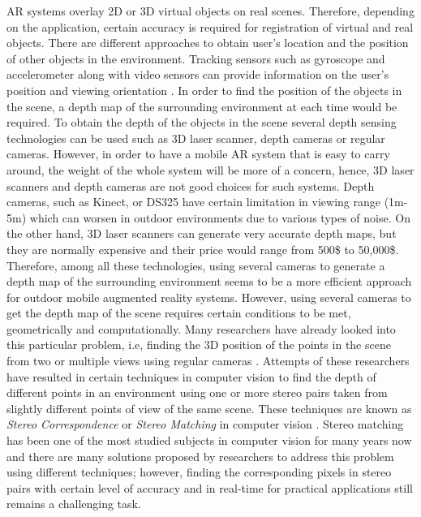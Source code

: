 \documentclass[12pt]{report}
\begin{document}
AR systems overlay 2D or 3D virtual objects on real scenes. Therefore, depending on the application, certain accuracy is required for 
registration of virtual and real objects. There are different approaches to obtain user's location and the position of other objects in the environment.
Tracking sensors such as gyroscope and accelerometer along with video sensors can provide information on the user's position and viewing orientation \cite{azum01}.
In order to find the position of the objects in the scene, a depth map of the surrounding environment at each time would be required. To obtain the depth of the 
objects in the scene several depth sensing technologies can be used such as 3D laser scanner, depth cameras or regular cameras. However, in order to have a mobile AR
system that is easy to carry around, the weight of the whole system will be more of a concern, hence, 3D laser scanners and depth cameras are not good choices for such systems.
Depth cameras, such as Kinect, or DS325 have certain limitation in viewing range (1m-5m) which can worsen in outdoor environments due to various types of noise. 
On the other hand, 3D laser scanners can
generate very accurate depth maps, but they are normally expensive and their price would range from 500\$ to 50,000\$. Therefore, among all these technologies, using several 
cameras to generate a depth map of the surrounding environment seems to be a more efficient approach for outdoor mobile augmented reality systems. {\newline}
However, using several cameras to get the depth map of the scene requires certain conditions to be met, geometrically and computationally. Many researchers have already looked into
this particular problem, i.e, finding the 3D position of the points in the scene from two or multiple views using regular cameras \cite{sze11}. Attempts of these researchers have resulted in
certain techniques in computer vision to find the depth of different points in an environment using one or more stereo pairs taken from slightly different points of view of the same scene.
These techniques are known as {\it Stereo Correspondence} or {\it Stereo Matching} in computer vision \cite{sze11}. Stereo matching has been one of the most studied subjects in computer vision for 
many years now and there are many solutions proposed by researchers to address this problem using different techniques; however, finding the corresponding pixels in stereo pairs with certain level of 
accuracy and in real-time for practical applications still remains a challenging task. {\newline}
\end{document}
